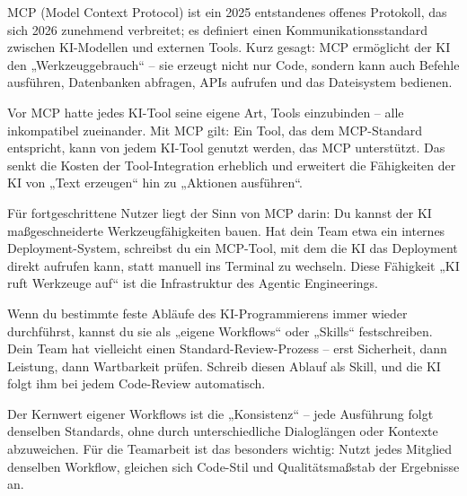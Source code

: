 


MCP (Model Context Protocol) ist ein 2025 entstandenes offenes Protokoll, das sich 2026 zunehmend verbreitet; es definiert einen Kommunikationsstandard zwischen KI-Modellen und externen Tools. Kurz gesagt: MCP ermöglicht der KI den „Werkzeuggebrauch“ – sie erzeugt nicht nur Code, sondern kann auch Befehle ausführen, Datenbanken abfragen, APIs aufrufen und das Dateisystem bedienen.

Vor MCP hatte jedes KI-Tool seine eigene Art, Tools einzubinden – alle inkompatibel zueinander. Mit MCP gilt: Ein Tool, das dem MCP-Standard entspricht, kann von jedem KI-Tool genutzt werden, das MCP unterstützt. Das senkt die Kosten der Tool-Integration erheblich und erweitert die Fähigkeiten der KI von „Text erzeugen“ hin zu „Aktionen ausführen“.

Für fortgeschrittene Nutzer liegt der Sinn von MCP darin: Du kannst der KI maßgeschneiderte Werkzeugfähigkeiten bauen. Hat dein Team etwa ein internes Deployment-System, schreibst du ein MCP-Tool, mit dem die KI das Deployment direkt aufrufen kann, statt manuell ins Terminal zu wechseln. Diese Fähigkeit „KI ruft Werkzeuge auf“ ist die Infrastruktur des Agentic Engineerings.


Wenn du bestimmte feste Abläufe des KI-Programmierens immer wieder durchführst, kannst du sie als „eigene Workflows“ oder „Skills“ festschreiben. Dein Team hat vielleicht einen Standard-Review-Prozess – erst Sicherheit, dann Leistung, dann Wartbarkeit prüfen. Schreib diesen Ablauf als Skill, und die KI folgt ihm bei jedem Code-Review automatisch.

Der Kernwert eigener Workflows ist die „Konsistenz“ – jede Ausführung folgt denselben Standards, ohne durch unterschiedliche Dialoglängen oder Kontexte abzuweichen. Für die Teamarbeit ist das besonders wichtig: Nutzt jedes Mitglied denselben Workflow, gleichen sich Code-Stil und Qualitätsmaßstab der Ergebnisse an.

